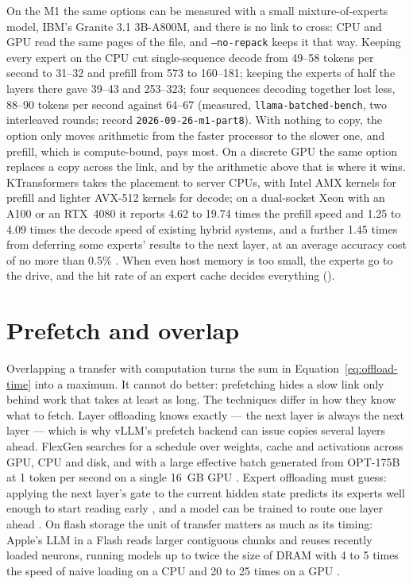 On the M1 the same options can be measured with a small mixture-of-experts
model, IBM's Granite 3.1 3B-A800M, and there is no link to cross: CPU and GPU
read the same pages of the file, and \texttt{--no-repack} keeps it that way.
Keeping every expert on the CPU cut single-sequence decode from 49--58 tokens
per second to 31--32 and prefill from 573 to 160--181; keeping the experts of
half the layers there gave 39--43 and 253--323; four sequences decoding
together lost less, 88--90 tokens per second against 64--67 (measured,
\texttt{llama-batched-bench}, two interleaved rounds; record
\texttt{2026-09-26-m1-part8}). With nothing to copy, the option only moves
arithmetic from the faster processor to the slower one, and prefill, which is
compute-bound, pays most. On a discrete GPU the same option replaces a copy
across the link, and by the arithmetic above that is where it wins.
KTransformers takes the placement to server CPUs, with Intel AMX kernels for
prefill and lighter AVX-512 kernels for decode; on a dual-socket Xeon with an
A100 or an RTX~4080 it reports 4.62 to 19.74 times the prefill speed and 1.25
to 4.09 times the decode speed of existing hybrid systems, and a further
1.45 times from deferring some experts' results to the next layer, at an
average accuracy cost of no more than 0.5\% \cite{chen2025ktransformers}. When
even host memory is too small, the experts go to the drive, and the hit rate of
an expert cache decides everything ().

\section{Prefetch and overlap}

Overlapping a transfer with computation turns the sum in
Equation~\ref{eq:offload-time} into a maximum. It cannot do better: prefetching
hides a slow link only behind work that takes at least as long. The techniques
differ in how they know what to fetch. Layer offloading knows exactly ---
the next layer is always the next layer --- which is why vLLM's prefetch
backend can issue copies several layers ahead. FlexGen searches for a schedule
over weights, cache and activations across GPU, CPU and disk, and with a large
effective batch generated from OPT-175B at 1 token per second on a single 16~GB
GPU \cite{sheng2023flexgen}. Expert offloading must guess: applying the next
layer's gate to the current hidden state predicts its experts well enough to
start reading early \cite{eliseev2023moeoffload}, and a model can be trained to
route one layer ahead \cite{hwang2023pregated}. On flash storage the unit of
transfer matters as much as its timing: Apple's LLM in a Flash reads larger
contiguous chunks and reuses recently loaded neurons, running models up to
twice the size of DRAM with 4 to 5 times the speed of naive loading on a CPU
and 20 to 25 times on a GPU \cite{alizadeh2024llmflash}.

